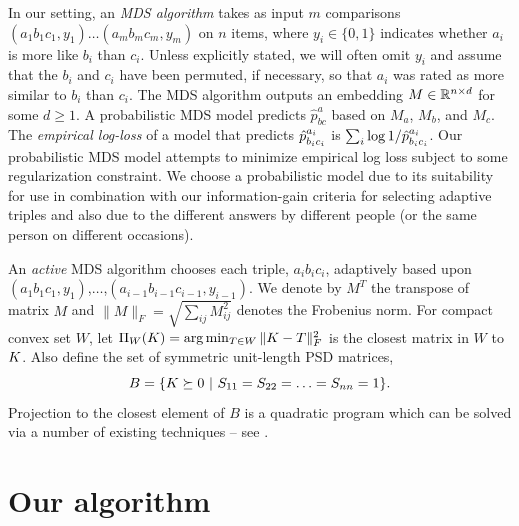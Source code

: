 \documentclass{article}
\begin{document}
In our setting, an {\em MDS algorithm} takes as input $m$ comparisons $(a_1b_1c_1,y_1) \ldots (a_mb_mc_m,y_m)$ on $n$ items, where $y_i\in \{0,1\}$ indicates whether $a_i$ is more like $b_i$ than $c_i$.  Unless explicitly stated, we will often omit $y_i$ and assume that the $b_i$ and $c_i$ have been permuted, if necessary, so that $a_i$ was rated as more similar to $b_i$ than $c_i$.  The MDS algorithm outputs an embedding $M \in \reals^{n \times d}$ for some $d \geq 1.$  A probabilistic MDS model predicts $\hat{p}^{a}_{bc}$ based on $M_a$, $M_b$, and $M_c$.  The {\em empirical log-loss} of a model that predicts $\hp^{a_i}_{b_ic_i}$ is $\sum_i \log 1/\hp^{a_i}_{b_ic_i}$.
Our probabilistic MDS model attempts to minimize empirical log loss subject to some regularization constraint.  We choose a probabilistic model due to its suitability for use in combination with our information-gain criteria for selecting adaptive triples and also due to the different answers by different people (or the same person on different occasions).


An {\em active} MDS algorithm chooses each triple, $a_ib_ic_i$, adaptively based upon $(a_1b_1c_1,y_1)$,$\ldots$,$(a_{i-1}b_{i-1}c_{i-1},y_{i-1})$.
We denote by $M^T$ the transpose of matrix $M$ and $\|M\|_F=\sqrt{\sum_{ij} M_{ij}^2}$ denotes the Frobenius norm.
For compact convex set $W$, let $\Pi_W(\S)=\arg\min_{T \in W} \|\S-T\|_F^2$ is the closest matrix in $W$ to $\S$.  Also define the set of symmetric  unit-length PSD matrices,
$$B=\{ \S \succeq 0 ~|~ S_{11}=S_{22}=\ldots=S_{nn}=1\}.$$
Projection to the closest element of $B$ is a quadratic program which can be solved via a number of existing techniques -- see \cite{SS05,LRSST10}.

\section{Our algorithm}
\end{document}
